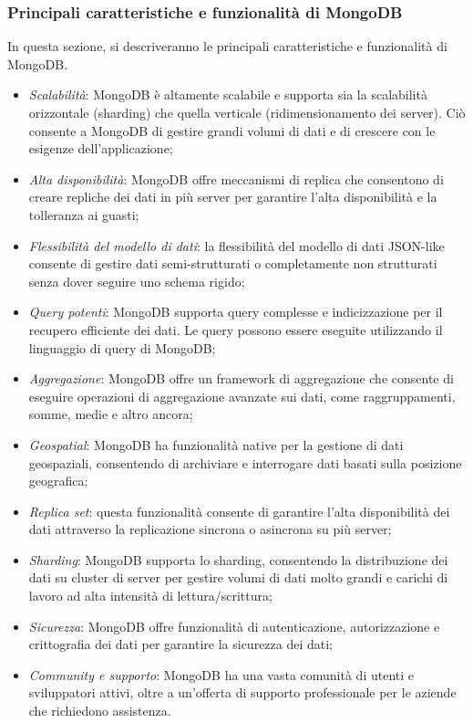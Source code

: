 \subsubsection{Principali caratteristiche e funzionalità di MongoDB}

In questa sezione, si descriveranno le principali caratteristiche e funzionalità di MongoDB.

\begin{itemize}
    \item \textit{Scalabilità}: MongoDB è altamente scalabile e supporta sia la scalabilità orizzontale (sharding) che quella verticale (ridimensionamento dei server). Ciò consente a MongoDB di gestire grandi volumi di dati e di crescere con le esigenze dell'applicazione; 
    \item \textit{Alta disponibilità}: MongoDB offre meccanismi di replica che consentono di creare repliche dei dati in più server per garantire l'alta disponibilità e la tolleranza ai guasti;
    \item \textit{Flessibilità del modello di dati}: la flessibilità del modello di dati JSON-like consente di gestire dati semi-strutturati o completamente non strutturati senza dover seguire uno schema rigido;
    \item \textit{Query potenti}: MongoDB supporta query complesse e indicizzazione per il recupero efficiente dei dati. Le query possono essere eseguite utilizzando il linguaggio di query di MongoDB; 
    \item \textit{Aggregazione}: MongoDB offre un framework di aggregazione che consente di eseguire operazioni di aggregazione avanzate sui dati, come raggruppamenti, somme, medie e altro ancora; 
    \item \textit{Geospatial}: MongoDB ha funzionalità native per la gestione di dati geospaziali, consentendo di archiviare e interrogare dati basati sulla posizione geografica; 
    \item \textit{Replica set}: questa funzionalità consente di garantire l'alta disponibilità dei dati attraverso la replicazione sincrona o asincrona su più server; 
    \item \textit{Sharding}: MongoDB supporta lo sharding, consentendo la distribuzione dei dati su cluster di server per gestire volumi di dati molto grandi e carichi di lavoro ad alta intensità di lettura/scrittura; 
    \item \textit{Sicurezza}: MongoDB offre funzionalità di autenticazione, autorizzazione e crittografia dei dati per garantire la sicurezza dei dati; 
    \item \textit{Community e supporto}: MongoDB ha una vasta comunità di utenti e sviluppatori attivi, oltre a un'offerta di supporto professionale per le aziende che richiedono assistenza.
\end{itemize}

